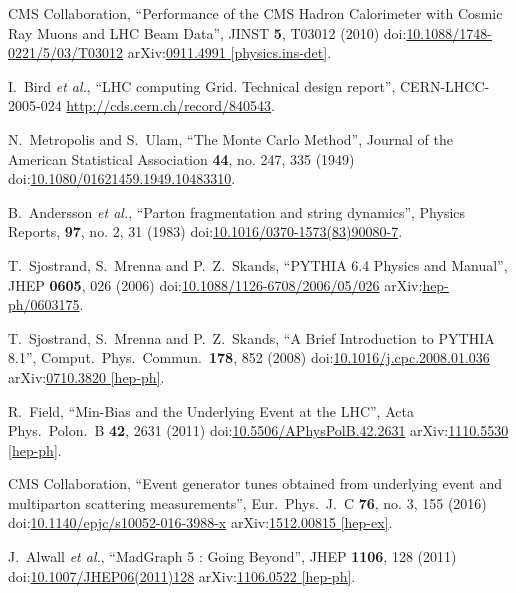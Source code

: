 \begin{thebibliography}{99}
CMS Collaboration, ``Performance of the CMS Hadron Calorimeter with Cosmic Ray Muons and LHC Beam Data'', JINST {\bf 5}, T03012 (2010) doi:\href{http://dx.doi.org/10.1088/1748-0221/5/03/T03012}{10.1088/1748-0221/5/03/T03012} arXiv:\href{https://arxiv.org/abs/0911.4991}{0911.4991 [physics.ins-det]}.

I.~Bird {\it et al.}, ``LHC computing Grid. Technical design report'', CERN-LHCC-2005-024 \url{http://cds.cern.ch/record/840543}.


N.~Metropolis and S.~Ulam, ``The Monte Carlo Method'', Journal of the American Statistical Association {\bf 44}, no. 247, 335 (1949) doi:\href{http://dx.doi.org/10.2307/2280232}{10.1080/01621459.1949.10483310}.

B.~Andersson {\it et al.}, ``Parton fragmentation and string dynamics'', Physics Reports, {\bf 97}, no. 2, 31 (1983) doi:\href{http://www.sciencedirect.com/science/article/pii/0370157383900807}{10.1016/0370-1573(83)90080-7}.

T.~Sjostrand, S.~Mrenna and P.~Z.~Skands, ``PYTHIA 6.4 Physics and Manual'', JHEP {\bf 0605}, 026 (2006) doi:\href{http://dx.doi.org/10.1088/1126-6708/2006/05/026}{10.1088/1126-6708/2006/05/026} arXiv:\href{https://arxiv.org/abs/hep-ph/0603175}{hep-ph/0603175}.

T.~Sjostrand, S.~Mrenna and P.~Z.~Skands, ``A Brief Introduction to PYTHIA 8.1'', Comput.\ Phys.\ Commun.\ {\bf 178}, 852 (2008) doi:\href{http://dx.doi.org/10.1016/j.cpc.2008.01.036}{10.1016/j.cpc.2008.01.036} arXiv:\href{https://arxiv.org/abs/0710.3820L}{0710.3820 [hep-ph]}.

R.~Field, ``Min-Bias and the Underlying Event at the LHC'', Acta Phys.\ Polon.\ B {\bf 42}, 2631 (2011) doi:\href{http://dx.doi.org/10.5506/APhysPolB.42.2631}{10.5506/APhysPolB.42.2631} arXiv:\href{https://arxiv.org/abs/1110.5530}{1110.5530 [hep-ph]}. 

CMS Collaboration, ``Event generator tunes obtained from underlying event and multiparton scattering measurements'', Eur.\ Phys.\ J.\ C {\bf 76}, no. 3, 155 (2016) doi:\href{http://dx.doi.org/10.1140/epjc/s10052-016-3988-x}{10.1140/epjc/s10052-016-3988-x} arXiv:\href{https://arxiv.org/abs/1512.00815}{1512.00815 [hep-ex]}.

J.~Alwall {\it et al.}, ``MadGraph 5 : Going Beyond'', JHEP {\bf 1106}, 128 (2011) doi:\href{https://doi.org/10.1007/JHEP06(2011)128}{10.1007/JHEP06(2011)128} arXiv:\href{https://arxiv.org/abs/1106.0522}{1106.0522 [hep-ph]}.


\end{thebibliography}
